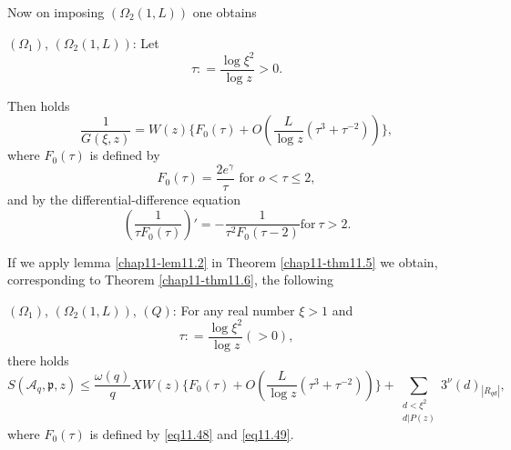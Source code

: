 Now on imposing $(\Omega_2 (1,L))$ one obtains

\begin{lemma}\label{chap11-lem11.2}%
$(\Omega_1)$, $(\Omega_2(1,L))$: Let
\begin{equation*}
\tau : = \frac{\log \xi^2}{\log z} > 0.\tag{11.46}\label{eq11.46}
\end{equation*}
\end{lemma}

Then holds
\begin{equation*}
\frac{1}{G(\xi,z)} = W (z) \{ F_0(\tau) + O (\frac{L} {\log z} (
\tau^3 + \tau^{-2}))\},\tag{11.47}\label{eq11.47} 
\end{equation*}
where $F_0(\tau)$ is defined by
\begin{equation*}
F_0(\tau) = \frac{2e^\gamma}{\tau} \text{ for } o < \tau \le
2,\tag{11.48} \label{eq11.48} 
\end{equation*}
and by the differential-difference equation
\begin{equation*}
(\frac{1}{\tau F_0(\tau)})' = - \frac{1}{\tau^2 F_0 (\tau-2)}
  \text{for} ~\tau >2.\tag{11.49}\label{eq11.49} 
\end{equation*}

If we apply lemma \ref{chap11-lem11.2} in Theorem \ref{chap11-thm11.5}
we obtain, corresponding to Theorem \ref{chap11-thm11.6}, the following 

\begin{theorem}\label{chap11-thm11.9}%
$(\Omega_1)$, $(\Omega_2(1,L))$, $(Q)$:  For any real number $\xi > 1$ and
\begin{equation*}
\tau : = \frac{\log \xi^2} {\log z} (> 0),\tag{11.50}\label{eq11.50} 
\end{equation*}
there holds
\begin{equation*}
 S (\mathscr{A}_q, \mathfrak{p}, z ) \le \frac{\omega(q)} {q} X W(z)
 \{ F_0 (\tau) + O (\frac{L}{\log z}(\tau^3 + \tau^{-2}))\}
 +\sum_{\substack{d<\xi^2\\ d|P(z)}}
 3^\nu(d){_{|R_{qd}|}},\tag{11.51}\label{eq11.51}    
\end{equation*} 
where $F_0(\tau)$ is defined by \eqref{eq11.48} and \eqref{eq11.49}.
\end{theorem}

